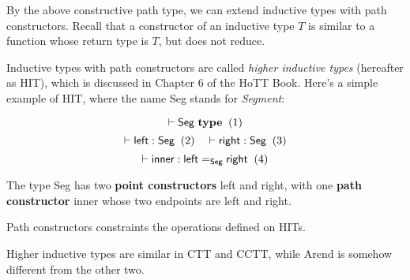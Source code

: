 By the above constructive path type,
we can extend inductive types with path constructors.
Recall that a constructor of an inductive type $T$ is
similar to a function whose return type is $T$,
but does not reduce.

Inductive types with path constructors are called
\textit{higher inductive types} (hereafter as HIT),
which is discussed in Chapter 6 of the HoTT Book.
Here's a simple example of HIT,
where the name \textsf{Seg} stands for \textit{Segment}:

\[
  \vdash \textsf{Seg} \ \textbf{type}
  \xtag
\]
\[
  \vdash \textsf{left} : \textsf{Seg}
  \xtag
  \quad
  \vdash \textsf{right} : \textsf{Seg}
  \xtag
\]
\[
  \vdash \textsf{inner} :
  \textsf{left} =_{\textsf{Seg}} \textsf{right}
  \xtag
\]

The type \textsf{Seg} has two \textbf{point constructors}
\textsf{left} and \textsf{right}, with one \textbf{path constructor}
\textsf{inner} whose two endpoints are \textsf{left} and \textsf{right}.

Path constructors constraints the operations defined on HITs.

Higher inductive types are similar in CTT and CCTT,
while Arend is somehow different from the other two.

\TODO